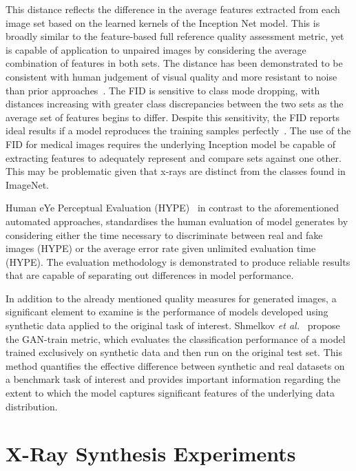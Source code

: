 \documentclass{article}
\begin{document}
This distance reflects the difference in the average features extracted from each image set based on the learned kernels of the Inception Net model. This is broadly similar to the feature-based full reference quality assessment metric, yet is capable of application to unpaired images by considering the average combination of features in both sets. The distance has been demonstrated to be consistent with human judgement of visual quality and more resistant to noise than prior approaches~\cite{heuselGANsTrainedTwo2018,lucicAreGANsCreated2018}. The FID is sensitive to class mode dropping, with distances increasing with greater class discrepancies between the two sets as the average set of features begins to differ. Despite this sensitivity, the FID reports ideal results if a model reproduces the training samples perfectly~\cite{lucicAreGANsCreated2018}. The use of the FID for medical images requires the underlying Inception model be capable of extracting features to adequately represent and compare sets against one other. This may be problematic given that x-rays are distinct from the classes found in ImageNet.

Human eYe Perceptual Evaluation (HYPE)~\cite{zhouHYPEBenchmarkHuman2019} in contrast to the aforementioned automated approaches, standardises the human evaluation of model generates by considering either the time necessary to discriminate between real and fake images (HYPE) or the average error rate given unlimited evaluation time (HYPE). The evaluation methodology is demonstrated to produce reliable results that are capable of separating out differences in model performance.

In addition to the already mentioned quality measures for generated images, a significant element to examine is the performance of models developed using synthetic data applied to the original task of interest. Shmelkov \emph{et al.}~\cite{shmelkovHowGoodMy2018} propose the GAN-train metric, which evaluates the classification performance of a model trained exclusively on synthetic data and then run on the original test set. This method quantifies the effective difference between synthetic and real datasets on a benchmark task of interest and provides important information regarding the extent to which the model captures significant features of the underlying data distribution.

\section{X-Ray Synthesis Experiments}
\end{document}
